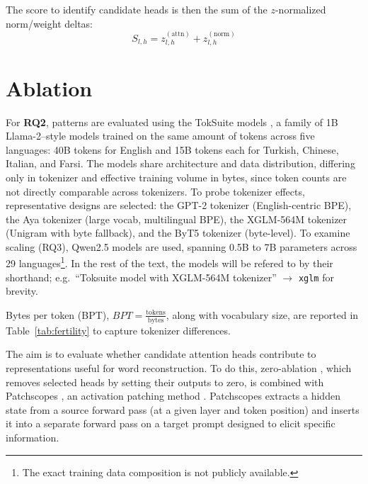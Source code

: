 The score to identify candidate heads is then the sum of the $z$-normalized norm/weight deltas:
\begin{equation}\label{eq:headscore}
S_{l,h} = z^{(\text{attn})}_{l,h} + z^{(\text{norm})}_{l,h}
\end{equation}

\section{Ablation}\label{sec:ablation}

For \textbf{RQ2}, patterns are evaluated using the TokSuite models \citep{altintas2025}, a family of 1B Llama-2–style models trained on the same amount of tokens across five languages: 40B tokens for English and 15B tokens each for Turkish, Chinese, Italian, and Farsi. The models share architecture and data distribution, differing only in tokenizer and effective training volume in bytes, since token counts are not directly comparable across tokenizers. To probe tokenizer effects, representative designs are selected: the GPT-2 tokenizer \citep{radford2019} (English-centric BPE), the Aya tokenizer \citep{aya} (large vocab, multilingual BPE), the XGLM-564M tokenizer \citep{xglm} (Unigram with byte fallback), and the ByT5 tokenizer \citep{xue2022} (byte-level). To examine scaling (RQ3), Qwen2.5 models are used\citep{qwen2.5, qwen2}, spanning 0.5B to 7B parameters across 29 languages\footnote{The exact training data composition is not publicly available.}. In the rest of the text, the models will be refered to by their shorthand; e.g.\ ``Toksuite model with XGLM-564M tokenizer'' $\rightarrow$ \texttt{xglm} for brevity.

Bytes per token (BPT), $BPT = \frac{\text{tokens}}{\text{bytes}}$, along with vocabulary size, are reported in Table~\ref{tab:fertility} to capture tokenizer differences.



The aim is to evaluate whether candidate attention heads contribute to representations useful for word reconstruction. To do this, zero-ablation \citep{michel2019}, which removes selected heads by setting their outputs to zero, is combined with Patchscopes \citep{ghandeharioun2024}, an activation patching method \citep{vig2020}. Patchscopes extracts a hidden state from a source forward pass (at a given layer and token position) and inserts it into a separate forward pass on a target prompt designed to elicit specific information.


